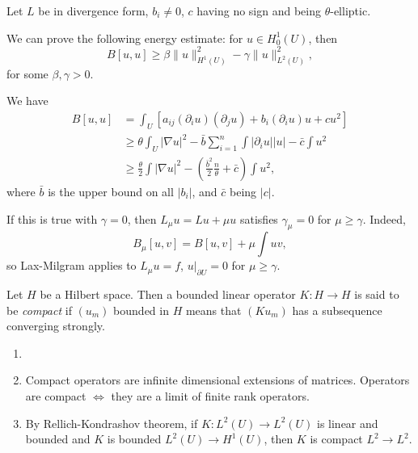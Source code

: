 \documentclass[12pt]{article}
\begin{document}
Let $L$ be in divergence form, $b_i \neq 0$, $c$ having no sign and being $\theta$-elliptic.

We can prove the following energy estimate: for $u \in H^1_0(U)$, then
\[
	B[u, u] \geq \beta \|u\|^2_{H^1(U)} - \gamma \|u\|^2_{L^2(U)},
\]
for some $\beta, \gamma > 0$.

\begin{proofbox}
	We have
	\begin{align*}
		B[u, u] &= \int_U \left[ a_{ij}(\partial_i u) (\partial_j u) + b_i(\partial_i u) u + c u^2 \right] \\
			&\geq \theta \int_U |\nabla u|^2 - \bar b \sum_{i = 1}^n \int|\partial_i u| |u| - \bar c \int u^2 \\
			&\geq \frac{\theta}{2} \int |\nabla u|^2 - \left( \frac{\bar b^2}{2} \frac{n}{\theta} + \bar c \right) \int u^2,
	\end{align*}
	where $\bar b$ is the upper bound on all $|b_i|$, and $\bar c$ being $|c|$.
\end{proofbox}

\begin{remark}
	If this is true with $\gamma = 0$, then $L_\mu u = Lu + \mu u$ satisfies $\gamma_\mu = 0$ for $\mu \geq \gamma$. Indeed,
	\[
		B_\mu[u, v] = B[u, v] + \mu \int uv,
	\]
	so Lax-Milgram applies to $L_\mu u = f$, $u|_{\partial U} = 0$ for $\mu \geq \gamma$.
\end{remark}

\begin{definition}
	Let $H$ be a Hilbert space. Then a bounded linear operator $K : H \to H$ is said to be \emph{compact} if $(u_m)$ bounded in $H$ means that $(K u_m)$ has a subsequence converging strongly.
\end{definition}

\begin{remark}
	\begin{enumerate}
		\item[]
		\item Compact operators are infinite dimensional extensions of matrices. Operators are compact $\iff$ they are a limit of finite rank operators.
		\item By Rellich-Kondrashov theorem, if $K : L^2(U) \to L^2(U)$ is linear and bounded and $K$ is bounded $L^2(U) \to H^1(U)$, then $K$ is compact $L^2 \to L^2$.
	\end{enumerate}
\end{remark}
\end{document}
